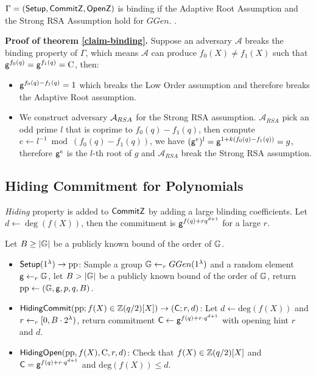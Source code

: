 \begin{theorem}
\label{claim-binding}
$\Gamma = (\mathsf{Setup}, \mathsf{CommitZ}, \mathsf{OpenZ})$ is \textup{binding} if the Adaptive Root Assumption and the Strong RSA Assumption hold for $GGen$. \cite{bunz2020transparent}.
\end{theorem}

\textbf{Proof of theorem \ref{claim-binding}.} Suppose an adversary $\mathcal{A}$ breaks the binding property of $\Gamma$, which means $\mathcal{A}$ can produce $f_0(X) \ne f_1(X)$ such that $\mathsf{g}^{f_0(q)} = \mathsf{g}^{f_1(q)} = \mathrm{C}$, then:
\begin{itemize}
    \item $\mathsf{g}^{f_0(q) - f_1(q)} = 1$ which breaks the Low Order assumption and therefore breaks the Adaptive Root assumption.
    \item We construct adversary $\mathcal{A}_{RSA}$ for the Strong RSA assumption. $\mathcal{A}_{RSA}$ pick an odd prime $l$ that is coprime to $f_0(q)-f_1(q)$, then compute $e \gets l^{-1} \bmod (f_0(q)-f_1(q))$, we have $(\mathsf{g}^e)^l = \mathsf{g}^{1 + k(f_0(q)-f_1(q))} = g$, therefore $\mathsf{g}^e$ is the $l$-th root of $g$ and $\mathcal{A}_{RSA}$ break the Strong RSA assumption.
\end{itemize}

\subsection{Hiding Commitment for Polynomials}

\textit{Hiding} property is added to $\mathsf{CommitZ}$ by adding a large blinding coefficients. Let $d \gets \deg(f(X))$, then the commitment is $\mathsf{g}^{f(q) + r q^{d+1}}$ for a large $r$.

\begin{definition}
Let $B \ge |\mathbb{G}|$ be a publicly known bound of the order of $\mathbb{G}$.
\begin{itemize}
    \item $\mathsf{Setup}(1^\lambda) \to \mathrm{pp}$: Sample a group $\mathbb{G} \gets_r GGen(1^\lambda)$ and a random element $\mathsf{g} \gets_r \mathbb{G}$, let $B > |\mathbb{G}|$ be a publicly known bound of the order of $\mathbb{G}$, return $\mathrm{pp} \gets (\mathbb{G}, \mathsf{g}, p, q, B)$.
    \item $\mathsf{HidingCommit}(\mathrm{pp}; f(X) \in \mathbb{Z}(q/2)[X]) \to (\mathsf{C}; r, d)$: Let $d \gets \mathrm{deg}(f(X))$ and $r \gets_r [0, B \cdot 2^\lambda)$, return commitment $\mathsf{C} \gets \mathsf{g}^{f(q) + r \cdot q^{d+1}}$ with opening hint $r$ and $d$.
    \item $\mathsf{HidingOpen}(\mathrm{pp}, f(X), \mathrm{C}, r, d)$: Check that $f(X) \in \mathbb{Z}(q/2)[X]$ and $\mathsf{C} = \mathsf{g}^{f(q) + r \cdot q^{d+1}}$ and $\mathrm{deg}(f(X)) \le d$.
\end{itemize}
\end{definition}

